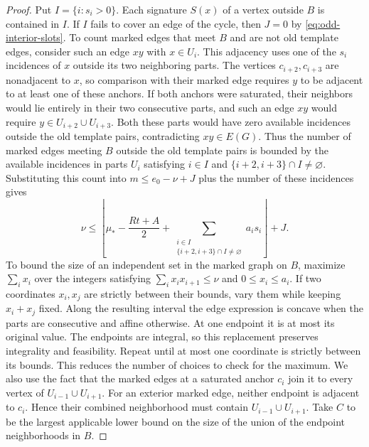 \documentclass[preprint,11pt,numbers]{elsarticle-arxiv}
\numberwithin{equation}{section}
\theoremstyle{definition}
\begin{document}
\begin{proof}
Put $I=\{i:s_i>0\}$. Each signature $S(x)$ of a vertex outside
$B$ is contained in $I$. If $I$ fails to cover an edge of the
cycle, then $J=0$ by \eqref{eq:odd-interior-slots}. To count
marked edges that meet $B$ and are not old template edges,
consider such an edge $xy$ with $x\in U_i$. This adjacency
uses one of the $s_i$ incidences of $x$ outside its two
neighboring parts. The vertices $c_{i+2},c_{i+3}$ are nonadjacent
to $x$, so comparison with their marked edge requires $y$
to be adjacent to at least one of these anchors. If both
anchors were saturated, their neighbors would lie entirely
in their two consecutive parts, and such an edge $xy$
would require $y\in U_{i+2}\cup U_{i+3}$. Both these parts
would have zero available incidences outside the old template
pairs, contradicting $xy\in E(G)$. Thus the number of marked
edges meeting $B$ outside
the old template pairs is bounded by the available incidences
in parts $U_i$ satisfying $i\in I$ and
$\{i+2,i+3\}\cap I\ne\varnothing$. Substituting this count
into $m\leq e_0-\nu+J$ plus the number of these incidences gives
\[
 \nu\leq\left\lfloor \mu_*-\frac{Rt+A}{2}+
 \sum_{\substack{i\in I\\ \{i+2,i+3\}\cap I\ne\varnothing}}a_is_i
 \right\rfloor+J.
\]
To bound the size of an independent set in the marked graph
on $B$, maximize $\sum_i x_i$ over the integers satisfying
$\sum_i x_ix_{i+1}\leq \nu$ and $0\leq x_i\leq a_i$.
If two coordinates $x_i,x_j$ are strictly between their
bounds, vary them while keeping $x_i+x_j$ fixed. Along the
resulting interval the edge expression is concave when the
parts are consecutive and affine otherwise. At one endpoint
it is at most its original value. The endpoints are integral,
so this replacement preserves integrality and feasibility.
Repeat until at most one coordinate is strictly between its
bounds. This reduces the number of choices to check for the
maximum. We also use the fact that the marked edges at a
saturated anchor $c_i$ join it to every vertex of
$U_{i-1}\cup U_{i+1}$. For an exterior marked edge, neither
endpoint is adjacent to $c_i$. Hence their combined
neighborhood must contain $U_{i-1}\cup U_{i+1}$. Take $C$
to be the largest applicable lower bound on the size of
the union of the endpoint neighborhoods in $B$.


\end{proof}
\end{document}
